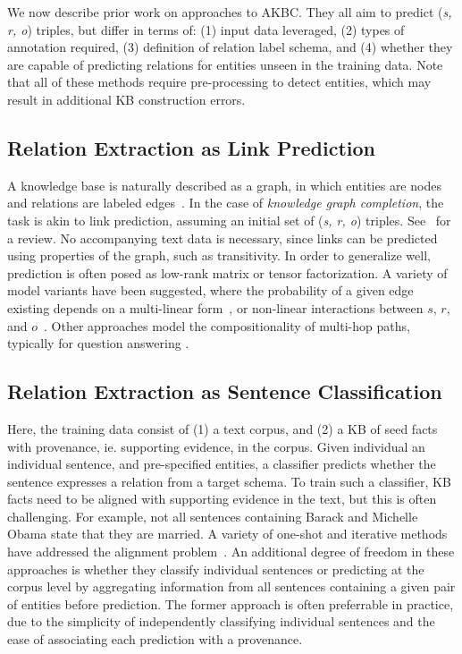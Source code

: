 We now describe prior work on approaches to AKBC. They all aim to predict (\emph{s, r, o}) triples, but differ in terms of: (1) input data leveraged, (2) types of annotation required, (3) definition of relation label schema, and (4) whether they are capable of predicting relations for entities unseen in the training data. Note that all of these methods require pre-processing to detect entities, which may result in additional KB construction errors.

\subsection{Relation Extraction as Link Prediction \label{sec:prediction}}
A knowledge base is naturally described as a graph, in which entities are nodes and relations are labeled edges~\citep{yago,freebase}. In the case of \emph{knowledge graph completion}, the task is akin to link prediction, assuming an initial set of (\emph{s, r, o}) triples. See~\citet{nickel2015review} for a review. No accompanying text data is necessary, since links can be predicted using properties of the graph, such as transitivity. In order to generalize well, prediction is often posed as low-rank matrix or tensor factorization. A variety of model variants have been suggested, where the probability of a given edge existing depends on a multi-linear form~\citep{rescal,DBLP:journals/corr/Garcia-DuranBUG15,bishan,transe,wang2014knowledge,lin2015learning}, or non-linear interactions between $s$, $r$, and $o$~\citep{socherkb}.
Other approaches model the compositionality of multi-hop paths, typically for question answering \citep{bordes2014question,gu2015traversing,neelakantan2015compositional}.

\subsection{Relation Extraction as Sentence Classification}
\label{seq:dist}

Here, the training data consist of (1) a text corpus, and (2) a KB of seed facts with provenance, ie. supporting evidence, in the corpus. Given individual an individual sentence, and pre-specified entities, a classifier predicts whether the sentence expresses a relation from a target schema. To train such a classifier, KB facts need to be aligned with supporting evidence in the text, but this is often challenging. For example, not all sentences containing Barack and Michelle Obama state that they are married. A variety of one-shot and iterative methods have addressed the alignment problem~\citep{bunescu2007learning,distant_supervision,riedel2010modeling,yao2010collective,hoffmann2011knowledge,surdeanu2012multi,min2013distant,zengdistant}.
An additional degree of freedom in these approaches is whether they classify individual sentences or predicting at the corpus level by aggregating information from all sentences containing a given pair of entities before prediction. The former approach is often preferrable in practice, due to the simplicity of independently classifying individual sentences and the ease of associating each prediction with a provenance.

